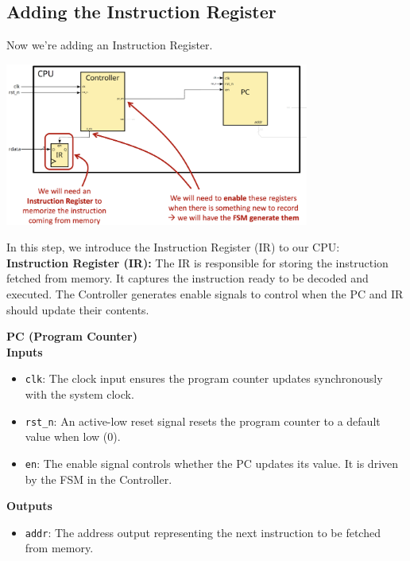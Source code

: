 \subsection{Adding the Instruction Register}
Now we're adding an Instruction Register.
\begin{center}
\includegraphics[width=0.75\textwidth]{chapters/chapter2a/images/p2.png}
\end{center}
In this step, we introduce the Instruction Register (IR) to our CPU: \\
\textbf{Instruction Register (IR):} The IR is responsible for storing the instruction fetched from memory. It captures the instruction ready to be decoded and executed. The Controller generates enable signals to control when the PC and IR should update their contents. \\
\noindent
\begin{minipage}[t]{0.3\textwidth}
    \footnotesize
    \textbf{PC (Program Counter)} \\ \vspace*{5px}
        \textbf{Inputs} 
        \begin{itemize}
            \item \texttt{clk}: The clock input ensures the program counter updates synchronously with the system clock.
            \item \texttt{rst\_n}: An active-low reset signal resets the program counter to a default value when low (0).
            \item \texttt{en}: The enable signal controls whether the PC updates its value. It is driven by the FSM in the Controller.
        \end{itemize}
         \textbf{Outputs}
        \begin{itemize}
            \item \texttt{addr}: The address output representing the next instruction to be fetched from memory.
        \end{itemize}
\end{minipage}
